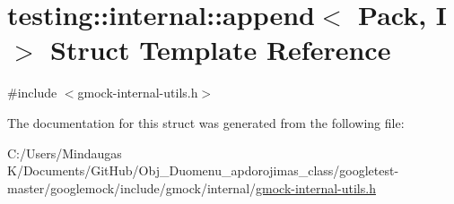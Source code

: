 \hypertarget{structtesting_1_1internal_1_1append}{}\section{testing\+::internal\+::append$<$ Pack, I $>$ Struct Template Reference}
\label{structtesting_1_1internal_1_1append}


{\ttfamily \#include $<$gmock-\/internal-\/utils.\+h$>$}



The documentation for this struct was generated from the following file\+:\begin{DoxyCompactItemize}
\item 
C\+:/\+Users/\+Mindaugas K/\+Documents/\+Git\+Hub/\+Obj\+\_\+\+Duomenu\+\_\+apdorojimas\+\_\+class/googletest-\/master/googlemock/include/gmock/internal/\mbox{\hyperlink{googletest-master_2googlemock_2include_2gmock_2internal_2gmock-internal-utils_8h}{gmock-\/internal-\/utils.\+h}}\end{DoxyCompactItemize}
